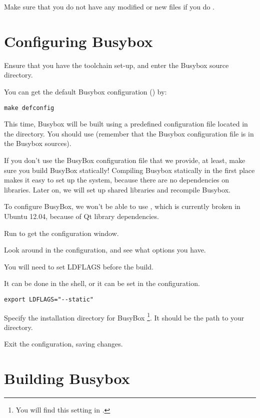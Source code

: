 Make sure that you do not have any modified or new files if you do .

\section{Configuring Busybox}

Ensure that you have the toolchain set-up, and enter the Busybox source directory.

You can get the default Busybox configuration () by:

\begin{verbatim}
make defconfig
\end{verbatim}

This time, Busybox will be built using a predefined configuration file located in the 
 directory. You should use 
(remember that the Busybox configuration file is  in the Busybox sources).

If you don't use the BusyBox configuration file that we provide, at least,
make sure you build BusyBox statically! Compiling Busybox
statically in the first place makes it easy to set up the system,
because there are no dependencies on libraries. Later on, we will set
up shared libraries and recompile Busybox.

To configure BusyBox, we won't be able to use ,
which is currently broken in Ubuntu 12.04, because of Qt library
dependencies.

Run  to get the configuration window.

Look around in the configuration, and see what options you have.

You will need to set LDFLAGS before the build.

It can be done in the shell, or it can be set in the configuration.

\begin{verbatim}
export LDFLAGS="--static"
\end{verbatim}

Specify the installation directory for BusyBox
\footnote{You will find this setting in
.}.
It should be the path to your  directory.

Exit the configuration, saving changes.

\section{Building Busybox}

